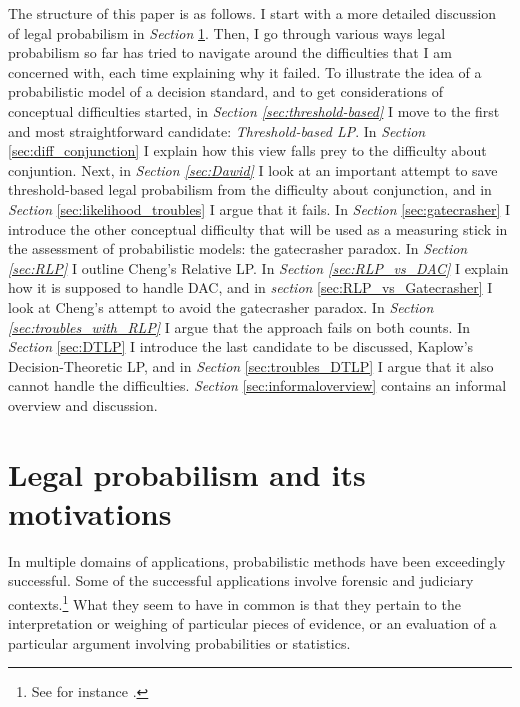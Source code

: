 \documentclass{ifcolog}
\begin{document}
The structure of this paper is as follows. I start with a more detailed discussion of legal probabilism in \emph{Section} \ref{sec:LP_and_motivations}. Then, I go through various ways legal probabilism so far has tried to navigate around the difficulties that I am concerned with, each time explaining why it failed. 
To illustrate the idea of a probabilistic model of a decision standard, and to get considerations of conceptual difficulties started, in \emph{Section \ref{sec:threshold-based}} I move to the first and most straightforward candidate: \emph{Threshold-based LP}. In \emph{Section} \ref{sec:diff_conjunction} I explain how this view falls prey to the  difficulty about conjuntion. Next, in \emph{Section \ref{sec:Dawid}} I look at an important attempt to save threshold-based legal probabilism  from the difficulty about conjunction, and in \emph{Section} \ref{sec:likelihood_troubles} I argue that it fails. In \emph{Section} \ref{sec:gatecrasher} I introduce the other conceptual difficulty that  will be  used as a measuring stick in the assessment of probabilistic models: the gatecrasher paradox. In \emph{Section \ref{sec:RLP}} I outline Cheng's Relative LP. In \emph{Section \ref{sec:RLP_vs_DAC}} I explain how it is supposed to handle DAC, and in \emph{section} \ref{sec:RLP_vs_Gatecrasher} I look at Cheng's attempt to avoid the gatecrasher paradox. In \emph{Section \ref{sec:troubles_with_RLP}} I argue that the approach fails on both counts. In \emph{Section} \ref{sec:DTLP}  I introduce the last candidate to be discussed, Kaplow's Decision-Theoretic LP, and  in \emph{Section} \ref{sec:troubles_DTLP} I argue that it also cannot handle the difficulties.   \emph{Section} \ref{sec:informaloverview} contains an informal overview and discussion.















\section{Legal probabilism and its motivations}\label{sec:LP_and_motivations}

In multiple domains of applications, probabilistic methods have been exceedingly successful. Some of the successful applications involve  forensic and judiciary contexts.\footnote{See for instance \citep{finkelstein2001statistics,aitken2004statistics,taroni2006bayesian,lucy2013introduction,robertson2016interpreting}.}  What they seem to have in common is that they pertain to the  interpretation or weighing of particular pieces of evidence, or an evaluation of a particular argument involving probabilities or statistics. 
\end{document}
